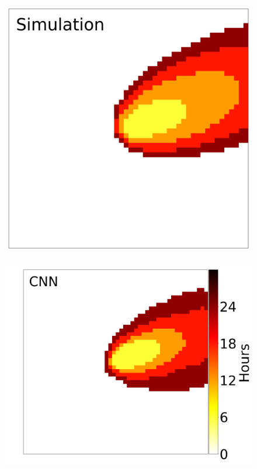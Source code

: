 \documentclass[smallcondensed]{svjour3}     %
\begin{document}
\begin{figure}[htbp]
  \centering
	\includegraphics[height=0.16\textheight]{timeAnalysis_simulation0.png}
	~
	\includegraphics[height=0.16\textheight]{timeAnalysis_network0.png}
	~

\end{figure}
\end{document}
